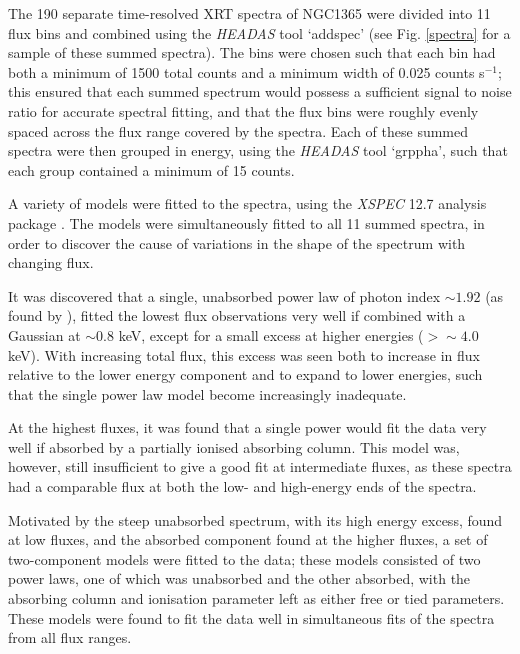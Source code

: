 \documentclass[useAMS,usenatbib]{sam}
\begin{document}

The 190 separate time-resolved XRT spectra of NGC1365 were divided into 11 flux bins and combined using the {\it HEADAS} tool `addspec' (see Fig. \ref{spectra} for a
sample of these summed spectra). The bins were chosen such that each bin had both a minimum of 1500 total counts and a minimum width of 0.025 counts s$^{-1}$; this
ensured that each summed spectrum would possess a sufficient signal to noise ratio for accurate spectral fitting, and that the flux bins were roughly evenly spaced across
the flux range covered by the spectra. Each of these summed spectra were then grouped in energy, using the {\it HEADAS} tool `grppha', such that each group contained a
minimum of 15 counts.

A variety of models were fitted to the spectra, using the {\it XSPEC} 12.7 analysis package \citep{arnaud}. The models were simultaneously fitted to all 11 summed
spectra, in order to discover the cause of variations in the shape of the spectrum with changing flux.  

It was discovered that a single, unabsorbed power law of photon index $\sim 1.92$ (as found by \citealt{risaliti13}), fitted the lowest flux observations very well if
combined with a Gaussian at $\sim 0.8$ keV, except for a small excess at higher energies ($> \sim 4.0$ keV). With increasing total flux, this excess was seen both to
increase in flux relative to the lower energy component and to expand to lower energies, such that the single power law model become increasingly inadequate. 

At the highest fluxes, it was found that a single power would fit the data very well if absorbed by a partially ionised absorbing column. This model was, however, still
insufficient to give a good fit at intermediate fluxes, as these spectra had a comparable flux at both the low- and high-energy ends of the spectra.

Motivated by the steep unabsorbed spectrum, with its high energy excess, found at low fluxes, and the absorbed component found at the higher fluxes, a set of
two-component models were fitted to the data; these models consisted of two power laws, one of which was unabsorbed and the other absorbed, with the absorbing column and
ionisation parameter left as either free or tied parameters. These models were found to fit the data well in simultaneous fits of the spectra from all flux ranges.
\end{document}
